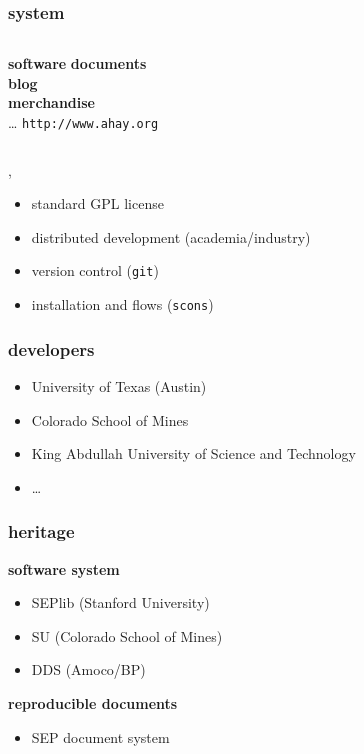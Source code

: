 \begin{frame} \frametitle{\mg system}

  \begin{columns}
    \textbf{software}
    \textbf{documents} \\
    \textbf{blog} \\
    \textbf{merchandise} \\
    \dots
    \alert{ \texttt{http://www.ahay.org} }
  \end{columns}

  \sep

  \begin{itemize}
  \item standard GPL license
  \item distributed development (academia/industry)
  \item version control (\texttt{git})
  \item installation and flows (\texttt{scons})
  \end{itemize}

\end{frame}
\cwpnote{}


\begin{frame} \frametitle{\mg developers}

  \begin{itemize}
  \item University of Texas (Austin)
  \item Colorado School of Mines
  \item King Abdullah University of Science and Technology
  \item \dots
  \end{itemize}

\end{frame}
\cwpnote{}


\begin{frame} \frametitle{\mg heritage}

  \textbf{software system}
  \begin{itemize}
  \item SEPlib (Stanford University)
  \item SU (Colorado School of Mines)
  \item DDS (Amoco/BP)
  \end{itemize}

  \vfill

  \textbf{reproducible documents}
  \begin{itemize}
  \item SEP document system
  \end{itemize}

\end{frame}
\cwpnote{}

